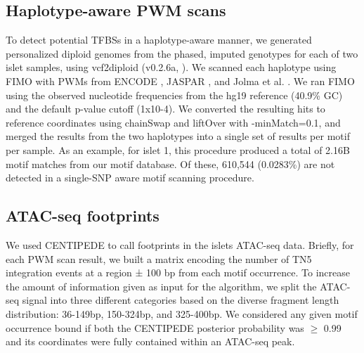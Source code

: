 \subsection{Haplotype-aware PWM scans}
To detect potential TFBSs in a haplotype-aware manner, we generated personalized diploid genomes from the phased, imputed genotypes for each of two islet samples, using vcf2diploid (v0.2.6a, \cite{rozowskyAlleleSeqAnalysisAllelespecific2011}). We scanned each haplotype using FIMO with PWMs from ENCODE \cite{kheradpourSystematicDiscoveryCharacterization2014}, JASPAR \cite{mathelierJASPAR2014Extensively2014}, and Jolma et al. \cite{jolmaDNABindingSpecificitiesHuman2013}. We ran FIMO using the observed nucleotide frequencies from the hg19 reference (40.9\% GC) and the default p-value cutoff (1x10-4). We converted the resulting hits to reference coordinates using chainSwap and liftOver with -minMatch=0.1, and merged the results from the two haplotypes into a single set of results per motif per sample. As an example, for islet 1, this procedure produced a total of 2.16B motif matches from our motif database. Of these, 610,544 (0.0283\%) are not detected in a single-SNP aware motif scanning procedure.

\subsection{ATAC-seq footprints}
We used CENTIPEDE \cite{pique-regiAccurateInferenceTranscription2011} to call footprints in the islets ATAC-seq data. Briefly, for each PWM scan result, we built a matrix encoding the number of TN5 integration events at a region ± 100 bp from each motif occurrence. To increase the amount of information given as input for the algorithm, we split the ATAC-seq signal into three different categories based on the diverse fragment length distribution: 36-149bp, 150-324bp, and 325-400bp. We considered any given motif occurrence bound if both the CENTIPEDE posterior probability was $\geq$ 0.99 and its coordinates were fully contained within an ATAC-seq peak. 

